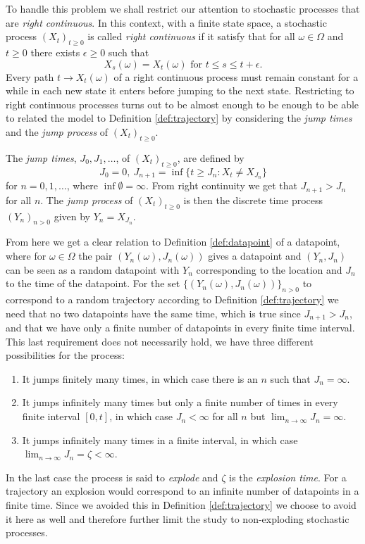 \documentclass[12pt]{article}
\theoremstyle{definition}
\begin{document}
To handle this problem we shall restrict our attention to stochastic
processes that are \emph{right continuous}. In this context, with a
finite state space, a stochastic process \((X_{t})_{t \geq 0}\) is
called \emph{right continuous} if it satisfy that for all
\(\omega \in \Omega\) and \(t \geq 0\) there exists
\(\epsilon \geq 0\) such that
\begin{equation*}
  X_{s}(\omega) = X_{t}(\omega) \text{ for } t \leq s \leq t + \epsilon.
\end{equation*}
Every path \(t \to X_{t}(\omega)\) of a right continuous process must
remain constant for a while in each new state it enters before jumping
to the next state. Restricting to right continuous processes turns out
to be almost enough to be enough to be able to related the model to
Definition \ref{def:trajectory} by considering the \emph{jump times}
and the \emph{jump process} of \((X_{t})_{t \geq 0}\).

The \emph{jump times}, \(J_{0}, J_{1}, \dots\), of
\((X_{t})_{t \geq 0}\), are defined by
\begin{equation*}
  J_{0} = 0,\ J_{n + 1} = \inf\{t \geq J_{n}: X_{t} \not= X_{J_{n}}\}
\end{equation*}
for \(n = 0, 1, \dots\), where \(\inf\emptyset = \infty\). From right
continuity we get that \(J_{n + 1} > J_{n}\) for all \(n\). The
\emph{jump process} of \((X_{t})_{t \geq 0}\) is then the discrete
time process \((Y_{n})_{n > 0}\) given by \(Y_{n} = X_{J_{n}}\).

From here we get a clear relation to Definition \ref{def:datapoint}
of a datapoint, where for \(\omega \in \Omega\) the pair
\((Y_{n}(\omega), J_{n}(\omega))\) gives a datapoint and
\((Y_{n}, J_{n})\) can be seen as a random datapoint with \(Y_{n}\)
corresponding to the location and \(J_{n}\) to the time of the
datapoint. For the set
\(\{(Y_{n}(\omega), J_{n}(\omega))\}_{n > 0}\) to correspond to a
random trajectory according to Definition \ref{def:trajectory} we need
that no two datapoints have the same time, which is true since
\(J_{n + 1} > J_{n}\), and that we have only a finite number of
datapoints in every finite time interval. This last requirement does
not necessarily hold, we have three different possibilities for the
process:
\begin{enumerate}
\item It jumps finitely many times, in which case there is an \(n\)
  such that \(J_{n} = \infty\).
\item It jumps infinitely many times but only a finite number of times
  in every finite interval \([0, t]\), in which case
  \(J_{n} < \infty\) for all \(n\) but
  \(\lim_{n \to \infty} J_{n} = \infty\).
\item It jumps infinitely many times in a finite interval, in which
  case \(\lim_{n \to \infty} J_{n} = \zeta < \infty\).
\end{enumerate}
In the last case the process is said to \emph{explode} and \(\zeta\)
is the \emph{explosion time}. For a trajectory an explosion would
correspond to an infinite number of datapoints in a finite time.
Since we avoided this in Definition \ref{def:trajectory} we choose to
avoid it here as well and therefore further limit the study to
non-exploding stochastic processes.
\end{document}
